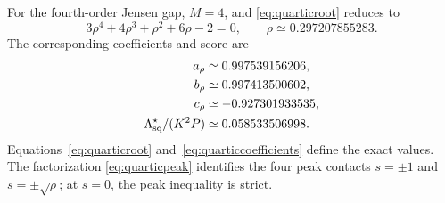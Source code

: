 For the fourth-order Jensen gap, $M=4$, and \eqref{eq:quarticroot} reduces to
$$
 3\rho^4+4\rho^3+\rho^2+6\rho-2=0,
 \qquad \rho\simeq0.297207855283.
$$
The corresponding coefficients and score are
\begin{align*}
 a_\rho&\simeq0.997539156206,\\
 b_\rho&\simeq0.997413500602,\\
 c_\rho&\simeq-0.927301933535,\\
 \Lambda_{\mathrm{sq}}^\star/(K^2P)&\simeq0.058533506998.
\end{align*}
Equations~\eqref{eq:quarticroot} and~\eqref{eq:quarticcoefficients} define the exact values. The factorization \eqref{eq:quarticpeak} identifies the four peak contacts $s=\pm1$ and $s=\pm\sqrt\rho$; at $s=0$, the peak inequality is strict.
